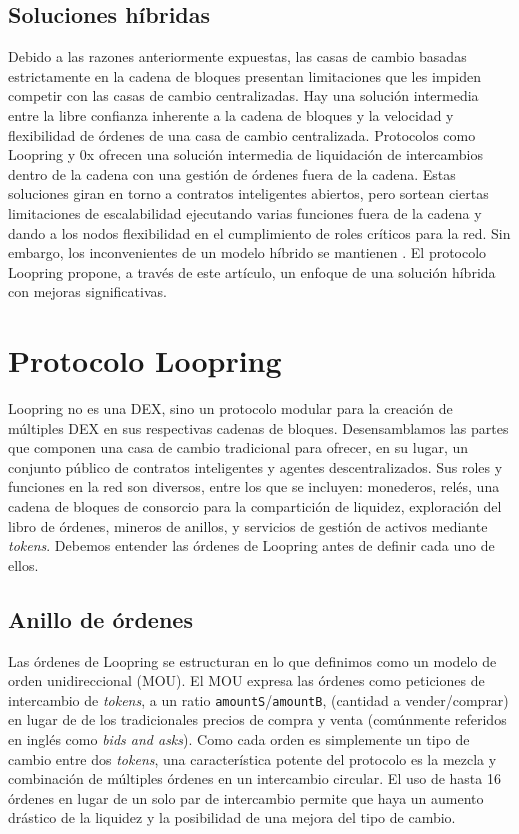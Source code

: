 \documentclass[UTF8,nofonts]{article}
\begin{document}
\begin{multicols}{2}
\subsection{Soluciones híbridas}
Debido a las razones anteriormente expuestas, las casas de cambio basadas estrictamente en la cadena de bloques presentan limitaciones que les impiden competir con las casas de cambio centralizadas. Hay una solución intermedia entre la libre confianza inherente a la cadena de bloques y la velocidad y flexibilidad de órdenes de una casa de cambio centralizada. Protocolos como Loopring y 0x \cite{warren20170x} ofrecen una solución intermedia de liquidación de intercambios dentro de la cadena con una gestión de órdenes fuera de la cadena. Estas soluciones giran en torno a contratos inteligentes abiertos, pero sortean ciertas limitaciones de escalabilidad ejecutando varias funciones fuera de la cadena y dando a los nodos flexibilidad en el cumplimiento de roles críticos para la red. Sin embargo, los inconvenientes de un modelo híbrido se mantienen \cite{costofdecent}. El protocolo Loopring propone, a través de este artículo, un enfoque de una solución híbrida con mejoras significativas.


\section{Protocolo Loopring\label{sec:loopring_protocol}}
Loopring no es una DEX, sino un protocolo modular para la creación de múltiples DEX en sus respectivas cadenas de bloques. Desensamblamos las partes que componen una casa de cambio tradicional para ofrecer, en su lugar, un conjunto público de contratos inteligentes y agentes descentralizados. Sus roles y funciones en la red son diversos, entre los que se incluyen: monederos, relés, una cadena de bloques de consorcio para la compartición de liquidez, exploración del libro de órdenes, mineros de anillos, y servicios de gestión de activos mediante \textit{tokens}. Debemos entender las órdenes de Loopring antes de definir cada uno de ellos.

\subsection{Anillo de órdenes\label{sec:order_ring}}
Las órdenes de Loopring se estructuran en lo que definimos como un modelo de orden unidireccional (MOU)\cite{coinport2014udom}. El MOU expresa las órdenes como peticiones de intercambio de \textit{tokens}, a un ratio \verb|amountS|/\verb|amountB|, (cantidad a vender/comprar)  en lugar de de los tradicionales precios de compra y venta (comúnmente referidos en inglés como \textit{bids and asks}). Como cada orden es simplemente un tipo de cambio entre dos \textit{tokens}, una característica potente del protocolo es la mezcla y combinación de múltiples órdenes en un intercambio circular. El uso de hasta 16 órdenes en lugar de un solo par de intercambio permite que haya un aumento drástico de la liquidez y la posibilidad de una mejora del tipo de cambio. 



\end{multicols}
\end{document}
